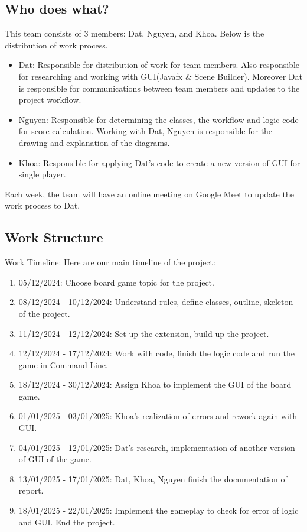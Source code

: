 \documentclass[conference]{IEEEtran}
\begin{document}
\subsection{Who does what?}
This team consists of 3 members: Dat, Nguyen, and Khoa. Below is the distribution of work process.
\begin{itemize}
    \item Dat: Responsible for distribution of work for team members. Also responsible for researching and working with GUI(Javafx \& Scene Builder). Moreover Dat is responsible for communications between team members and updates to the project workflow.
    
    \item Nguyen: Responsible for determining the classes, the workflow and logic code for score calculation. Working with Dat, Nguyen is responsible for the drawing and explanation of the diagrams.

    \item Khoa: Responsible for applying Dat's code to create a new version of GUI for single player.
\end{itemize}

Each week, the team will have an online meeting on Google Meet to update the work process to Dat. 

\subsection{Work Structure}   
Work Timeline: Here are our main timeline of the project:
\begin{enumerate}
    \item 05/12/2024: Choose board game topic for the project.
    \item 08/12/2024 - 10/12/2024: Understand rules, define classes, outline, skeleton of the project.
    \item 11/12/2024 - 12/12/2024: Set up the extension, build up the project.
    \item 12/12/2024 - 17/12/2024: Work with code, finish the logic code and run the game in Command Line.
    \item 18/12/2024 - 30/12/2024: Assign Khoa to implement the GUI of the board game.
    \item 01/01/2025 - 03/01/2025: Khoa's realization of errors and rework again with GUI.
    \item 04/01/2025 - 12/01/2025: Dat's research, implementation of another version of GUI of the game. 
    \item 13/01/2025 - 17/01/2025: Dat, Khoa, Nguyen finish the documentation of report.
    \item 18/01/2025 - 22/01/2025: Implement the gameplay to check for error of logic and GUI. End the project.
\end{enumerate}
\end{document}

